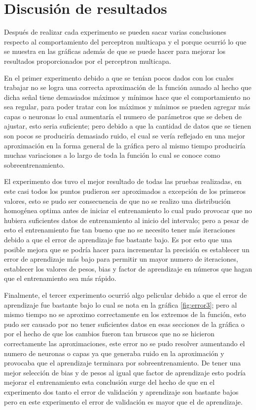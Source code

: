 \section{Discusión de resultados}
Después de realizar cada experimento se pueden sacar varias conclusiones respecto al comportamiento del perceptron multicapa y el porque ocurrió lo que se muestra en las gráficas además de que se puede hacer para mejorar los resultados proporcionados por el perceptron multicapa.

En el primer experimento debido a que se tenían pocos dados con los cuales trabajar no se logra una correcta aproximación de la función aunado al hecho que dicha señal tiene demasiados máximos y mínimos hace que el comportamiento no sea regular, para poder tratar con los máximos y mínimos se pueden agregar más capas o neuronas lo cual aumentaría el numero de parámetros que se deben de ajustar, esto seria suficiente; pero debido a que la cantidad de datos que se tienen son pocos se produciría demasiado ruido, el cual se vería reflejado en una mejor aproximación en la forma general de la gráfica pero al mismo tiempo produciría muchas variaciones a lo largo de toda la función lo cual se conoce como sobreentrenamiento.

El experimento dos tuvo el mejor resultado de todas las pruebas realizadas, en este casi todos los puntos pudieron ser aproximados a excepción de los primeros valores, esto se pudo ser consecuencia de que no se realizo una distribución homogénea optima antes de iniciar el entrenamiento lo cual pudo provocar que no hubiera suficientes datos de entrenamiento al inicio del intervalo; pero a pesar de esto el entrenamiento fue tan bueno que no se necesito tener más iteraciones debido a que el error de aprendizaje fue bastante bajo. Es por esto que una posible mejora que se podría hacer para incrementar la precisión es establecer un error de aprendizaje más bajo para permitir un mayor numero de iteraciones, establecer los valores de pesos, bias y factor de aprendizaje en números que hagan que el entrenamiento sea más rápido.

Finalmente, el tercer experimento ocurrió algo pelicular debido a que el error de aprendizaje fue bastante bajo lo cual se nota en la gráfica \ref{fig:error3}; pero al mismo tiempo no se aproximo correctamente en los extremos de la función, esto pudo ser causado por no tener suficientes datos en esas secciones de la gráfica o por el hecho de que los cambios fueron tan bruscos que no se hicieron correctamente las aproximaciones, este error no se pudo resolver aumentando el numero de neuronas o capas ya que generaba ruido en la aproximación y provocaba que el aprendizaje terminara por sobreentrenamiento. De tener una mejor selección de bias y de pesos al igual que factor de aprendizaje esto podría mejorar el entrenamiento esta conclusión surge del hecho de que en el experimento dos tanto el error de validación y aprendizaje son bastante bajos pero en este experimento el error de validación es mayor que el de aprendizaje.